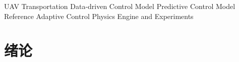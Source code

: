 \documentclass[lang=chs, degree=master, blindreview=true, winfonts=true]{yanputhesis}
\begin{document}
\begin{engabstract}
   
   
    \begin{engkeywords}                                     %
        UAV Transportation \ensep Data-driven Control \ensep Model Predictive Control \ensep Model Reference Adaptive Control \ensep Physics Engine and Experiments         %
    \end{engkeywords}                                       %
\end{engabstract}                                           %
\tableofcontents                                            %
\mainmatter
\sDefault

\chapter{绪论}
\end{document}
